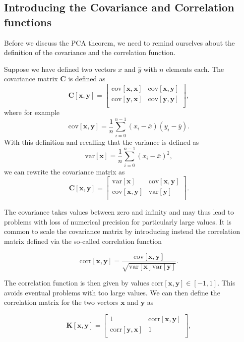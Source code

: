 \documentclass[%
oneside,                 %
final,                   %
10pt]{article}
\begin{document}
\noindent
\subsection*{Introducing the Covariance and Correlation functions}

Before we discuss the PCA theorem, we need to remind ourselves about
the definition of the covariance and the correlation function.

Suppose we have defined two vectors
$\hat{x}$ and $\hat{y}$ with $n$ elements each. The covariance matrix $\bm{C}$ is defined as 
\[
\bm{C}[\bm{x},\bm{y}] = \begin{bmatrix} \mathrm{cov}[\bm{x},\bm{x}] & \mathrm{cov}[\bm{x},\bm{y}] \\
                              \mathrm{cov}[\bm{y},\bm{x}] & \mathrm{cov}[\bm{y},\bm{y}] \\
             \end{bmatrix},
\]
where for example
\[
\mathrm{cov}[\bm{x},\bm{y}] =\frac{1}{n} \sum_{i=0}^{n-1}(x_i- \overline{x})(y_i- \overline{y}).
\]
With this definition and recalling that the variance is defined as
\[
\mathrm{var}[\bm{x}]=\frac{1}{n} \sum_{i=0}^{n-1}(x_i- \overline{x})^2,
\]
we can rewrite the covariance matrix as 
\[
\bm{C}[\bm{x},\bm{y}] = \begin{bmatrix} \mathrm{var}[\bm{x}] & \mathrm{cov}[\bm{x},\bm{y}] \\
                              \mathrm{cov}[\bm{x},\bm{y}] & \mathrm{var}[\bm{y}] \\
             \end{bmatrix}.
\]

The covariance takes values between zero and infinity and may thus
lead to problems with loss of numerical precision for particularly
large values. It is common to scale the covariance matrix by
introducing instead the correlation matrix defined via the so-called
correlation function

\[
\mathrm{corr}[\bm{x},\bm{y}]=\frac{\mathrm{cov}[\bm{x},\bm{y}]}{\sqrt{\mathrm{var}[\bm{x}] \mathrm{var}[\bm{y}]}}.
\]

The correlation function is then given by values $\mathrm{corr}[\bm{x},\bm{y}]
\in [-1,1]$. This avoids eventual problems with too large values. We
can then define the correlation matrix for the two vectors $\bm{x}$
and $\bm{y}$ as

\[
\bm{K}[\bm{x},\bm{y}] = \begin{bmatrix} 1 & \mathrm{corr}[\bm{x},\bm{y}] \\
                              \mathrm{corr}[\bm{y},\bm{x}] & 1 \\
             \end{bmatrix},
\]
\end{document}
